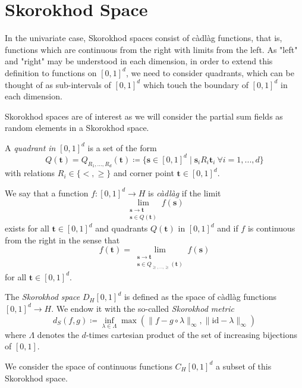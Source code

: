 \section{Skorokhod Space}

In the univariate case, Skorokhod spaces consist of càdlàg functions, that is, functions which are continuous from the right with limits from the left. As "left" and "right" may be understood in each dimension, in order to extend this definition to functions on $[0, 1]^d$, we need to consider quadrants, which can be thought of as  sub-intervals of $[0, 1]^d$ which touch the boundary of $[0, 1]^d$ in each dimension.

Skorokhod spaces are of interest as we will consider the partial sum fields as random elements in a Skorokhod space.

\begin{defn}[Quadrant]
    A \textit{quadrant in}  $[0, 1]^d$ is a set of the form
    \[ Q(\mathbf{t}) = Q_{R_1, ..., R_d}(\mathbf{t}) \coloneqq \{ \mathbf{s} \in [0, 1]^d \mid \mathbf{s}_i R_i \mathbf{t}_i \ \forall i = 1, ..., d \} \]
    with relations $R_i \in \{ <, \geq \}$ and corner point $\mathbf{t} \in [0, 1]^d$. 
\end{defn}


\begin{defn}
    We say that a function $f: [0, 1]^d \to H$ is \textit{càdlàg} if the limit
    \[ \lim\limits_{\substack{\mathbf{s} \to \mathbf{t} \\ \mathbf{s} \in Q(\mathbf{t})}} f(\mathbf{s}) \]
    exists for all $\mathbf{t} \in [0, 1]^d$ and quadrants $Q(\mathbf{t})$ in $[0, 1]^d$ and if $f$ is continuous from the right in the sense that
    \[ f(\mathbf{t}) = \lim\limits_{\substack{\mathbf{s} \to \mathbf{t} \\ \mathbf{s} \in Q_{\geq, ..., \geq}(\mathbf{t})}} f(\mathbf{s}) \]
    for all $\mathbf{t} \in [0, 1]^d$.
\end{defn}

\begin{defn}
    The \textit{Skorokhod space} $D_H[0, 1]^d$ is defined as the space of càdlàg functions $[0, 1]^d \to H$. We endow it with the so-called \textit{Skorokhod metric}
    \[ d_S(f, g) \coloneqq \inf\limits_{\lambda \in \Lambda} \max( \| f - g \circ \lambda \|_\infty, \| \mathrm{id} - \lambda \|_\infty) \]
    where $\Lambda$ denotes the $d$-times cartesian product of the set of increasing bijections of $[0, 1]$.

    We consider the space of continuous functions $C_H[0, 1]^d$ a subset of this Skorokhod space.
\end{defn}

